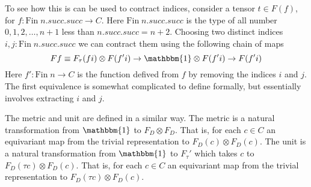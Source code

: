 \documentclass[a4paper, 11pt]{article}
\begin{document}
To see how this is can be used to contract indices, consider a tensor $t \in F(f)$, 
for $f : \mathrm{Fin} \; n.succ.succ \to C$. Here $\mathrm{Fin} \; n.succ.succ$ is the type 
of all number ${0, 1, 2, \ldots, n+1}$ less than $n.succ.succ = n + 2$. 
Choosing two distinct indices $i, j : \mathrm{Fin} \; n.succ.succ$ we can contract them 
using the following chain of maps
\begin{equation}
  F f \equiv F_\tau (f i) \otimes F (f' i) \to \mathbbm{1} \otimes F (f' i) \to F (f' i)
\end{equation}
Here $f' : \mathrm{Fin} \; n \to C$ is the function defived from $f$ by removing the indices $i$ 
and $j$. The first equivalence is somewhat complicated to define formally, but essentially involves 
extracting $i$ and $j$. 

The metric and unit are defined in a similar way. The metric is a natural transformation from
$\mathbbm{1}$ to $F_D\otimes F_D$. That is, for each $c \in C$ an equivariant map from the trivial
representation to $F_D(c) \otimes F_D(c)$. The unit is a natural transformation from $\mathbbm{1}$ to
$F_\tau'$ which takes $c$ to $F_D(\tau c) \otimes F_D(c)$. That is, for each $c \in C$ an 
equivariant map from the trivial representation to  $F_D(\tau c) \otimes F_D(c)$.
\end{document}
